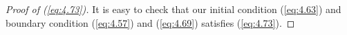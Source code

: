 \documentclass[10pt,a4paper]{amsart}
\begin{document}
\begin{proof}[Proof of (\ref{eq:4.73})]
    It is easy to check that our initial condition (\ref{eq:4.63}) and boundary condition (\ref{eq:4.57}) and (\ref{eq:4.69}) satisfies (\ref{eq:4.73}). 


\end{proof}
\end{document}
